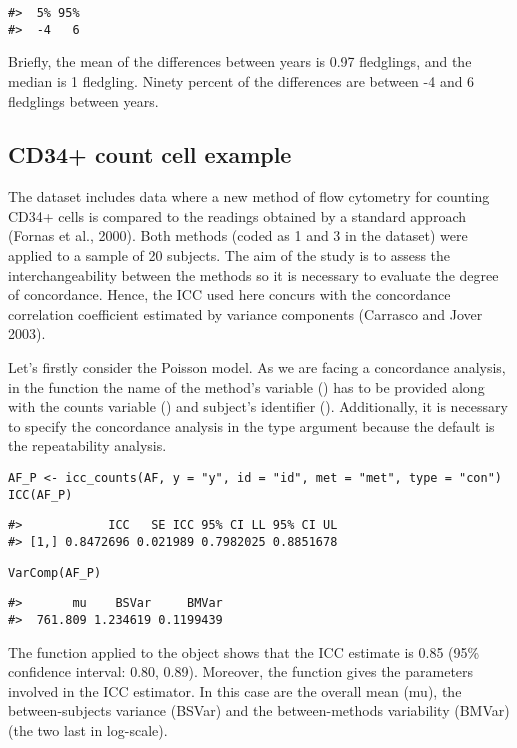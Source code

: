 \begin{verbatim}
#>  5% 95% 
#>  -4   6
\end{verbatim}

Briefly, the mean of the differences between years is 0.97 fledglings, and the median is 1 fledgling. Ninety percent of the differences are between -4 and 6 fledglings between years.

\hypertarget{cd34-count-cell-example}{%
\subsection{CD34+ count cell example}\label{cd34-count-cell-example}}

The dataset  includes data where a new method of flow cytometry for counting CD34+ cells is compared to the readings obtained by a standard approach (Fornas et al., 2000). Both methods (coded as 1 and 3 in the dataset) were applied to a sample of 20 subjects. The aim of the study is to assess the interchangeability between the methods so it is necessary to evaluate the degree of concordance. Hence, the ICC used here concurs with the concordance correlation coefficient estimated by variance components (Carrasco and Jover 2003).

Let's firstly consider the Poisson model. As we are facing a concordance analysis, in the  function the name of the method's variable () has to be provided along with the counts variable () and subject's identifier (). Additionally, it is necessary to specify the concordance analysis in the type argument because the default is the repeatability analysis.

\begin{verbatim}
AF_P <- icc_counts(AF, y = "y", id = "id", met = "met", type = "con")
ICC(AF_P)
\end{verbatim}

\begin{verbatim}
#>            ICC   SE ICC 95% CI LL 95% CI UL
#> [1,] 0.8472696 0.021989 0.7982025 0.8851678
\end{verbatim}

\begin{verbatim}
VarComp(AF_P)
\end{verbatim}

\begin{verbatim}
#>       mu    BSVar     BMVar
#>  761.809 1.234619 0.1199439
\end{verbatim}

The function  applied to the  object shows that the ICC estimate is 0.85 (95\% confidence interval: 0.80, 0.89). Moreover, the function  gives the parameters involved in the ICC estimator. In this case are the overall mean (mu), the between-subjects variance (BSVar) and the between-methods variability (BMVar) (the two last in log-scale).

